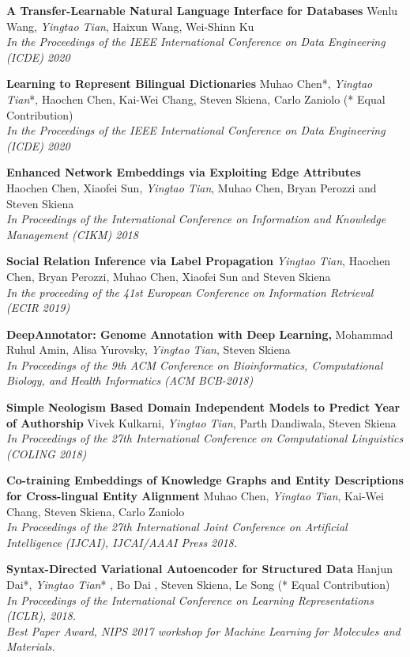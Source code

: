 \documentclass[line,margin]{cv}
\begin{document}
\begin{resume}
  {\bf  A Transfer-Learnable Natural Language Interface for Databases}
  Wenlu Wang, \emph{Yingtao Tian}, Haixun Wang, Wei-Shinn Ku\\
  \emph{In the Proceedings of the IEEE International Conference on Data Engineering (ICDE) 2020}
  
  {\bf  Learning to Represent Bilingual Dictionaries}
  Muhao Chen*, \emph{Yingtao Tian}*, Haochen Chen, Kai-Wei Chang, Steven Skiena, Carlo Zaniolo  (* Equal Contribution)\\
  \emph{In the Proceedings of the IEEE International Conference on Data Engineering (ICDE) 2020}
  
  {\bf  Enhanced Network Embeddings via Exploiting Edge Attributes}
   Haochen Chen, Xiaofei Sun, \emph{Yingtao Tian}, Muhao Chen, Bryan Perozzi and Steven Skiena\\
  \emph{In Proceedings of the International Conference on Information and Knowledge Management (CIKM) 2018}

  {\bf Social Relation Inference via Label Propagation}
  \emph{Yingtao Tian}, Haochen Chen, Bryan Perozzi, Muhao Chen, Xiaofei Sun and Steven Skiena\\
  \emph{In the proceeding of the 41st European Conference on Information Retrieval (ECIR 2019)}
  
  {\bf DeepAnnotator: Genome Annotation with Deep Learning,}
  Mohammad Ruhul Amin, Alisa Yurovsky, \emph{Yingtao Tian}, Steven Skiena \\
  \emph{In Proceedings of the 9th ACM Conference on Bioinformatics, Computational Biology, and Health Informatics (ACM BCB-2018)}
  
  {\bf Simple Neologism Based Domain Independent Models to Predict Year of Authorship}
   Vivek Kulkarni, \emph{Yingtao Tian}, Parth Dandiwala, Steven Skiena \\
  \emph{In Proceedings of the 27th International Conference on Computational Linguistics (COLING 2018)}

  {\bf Co-training Embeddings of Knowledge Graphs and Entity Descriptions for Cross-lingual Entity Alignment}
  Muhao Chen, \emph{Yingtao Tian}, Kai-Wei Chang, Steven Skiena, Carlo Zaniolo\\
  \emph{In Proceedings of the 27th International Joint Conference on Artificial Intelligence (IJCAI), IJCAI/AAAI Press 2018.}
  
  {\bf Syntax-Directed Variational Autoencoder for Structured Data}
  Hanjun Dai*, \emph{Yingtao Tian}* , Bo Dai , Steven Skiena, Le Song (* Equal Contribution)\\
  \emph{In Proceedings of the International Conference on Learning Representations (ICLR), 2018. \\
  Best Paper Award, NIPS 2017 workshop for Machine Learning for Molecules and Materials.}
  

\end{resume}
\end{document}
